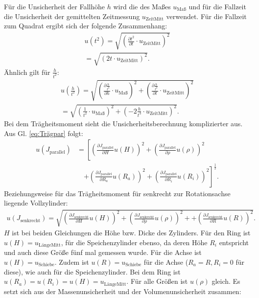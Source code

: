 Für die Unsicherheit der Fallhöhe $h$ wird die des Maßes $u_\text{Maß}$ und für die Fallzeit die Unsicherheit der gemittelten Zeitmessung $u_\text{ZeitMitt}$ verwendet. Für die Fallzeit zum Quadrat ergibt sich der folgende Zusammenhang:
\begin{align*}
u(t^2) = \sqrt{\left( \frac{\partial t^2}{\partial t}\cdot u_\text{ZeitMitt}\right) ^2}\\
= \sqrt{\left( 2 t\cdot u_\text{ZeitMitt}\right) ^2}.
\end{align*}
Ähnlich gilt für $\frac{h}{t^2}$:
\begin{align*}
u\left( \frac{h}{t^2}\right) = \sqrt{\left( \frac{\partial \frac{h}{t^2}}{\partial h}\cdot u_\text{Maß}\right) ^2 + \left( \frac{\partial \frac{h}{t^2}}{\partial t}\cdot u_\text{ZeitMitt}\right) ^2}\\
= \sqrt{\left( \frac{1}{t^2}\cdot u_\text{Maß} \right) ^2 + \left(-2 \frac{h}{t^3}\cdot u_\text{ZeitMitt} \right) ^2}.
\end{align*}
Bei dem Trägheitsmoment sieht die Unsicherheitsberechnung komplizierter aus. Aus Gl. \ref{eq:Trägpar} folgt:
\begin{align*}
u(J_\text{parallel}) &= 
\left[\left( \frac{\partial J_\text{parallel}}{\partial H}u(H)\right)^2  				
+ \left( \frac{\partial J_\text{parallel}}{\partial \rho}u(\rho)\right)^2 \right.\\ 
&\quad\left.+ \left( \frac{\partial J_\text{parallel}}{\partial R_a}u(R_a)\right)^2 
+ \left( \frac{\partial J_\text{parallel}}{\partial R_i}u(R_i)\right)^2\right]^{\frac{1}{2}}.			 
\end{align*}
Beziehungsweise für das Trägheitsmoment für senkrecht zur Rotationsachse liegende Vollzylinder:
\begin{align*}
u(J_\text{senkrecht}) = \sqrt{\left( \frac{\partial J_\text{senkrecht}}{\partial H}u(H)\right)^2 				
	+ \left( \frac{\partial J_\text{senkrecht}}{\partial \rho}u(\rho)\right)^2 + 
	+ \left( \frac{\partial J_\text{senkrecht}}{\partial R}u(R)\right)^2}.			 
\end{align*}
$H$ ist bei beiden Gleichungen die Höhe bzw. Dicke des Zylinders. Für den Ring ist $u(H) =  u_\text{LängeMitt}$, für die Speichenzylinder ebenso, da deren Höhe $R_i$ entspricht und auch diese Größe fünf mal gemessen wurde. Für die Achse ist $u(H) =  u_\text{Schiebe}$. Zudem ist $u(R) = u_\text{Schiebe}$ für die Achse ($R_a = R, R_i = 0$ für diese), wie auch für die Speichenzylinder. Bei dem Ring ist $u(R_a) = u(R_i) = u(H) = u_\text{LängeMitt}$.
Für alle Größen ist $u(\rho)$ gleich. Es setzt sich aus der Massenunsicherheit und der Volumenunsicherheit zusammen:
